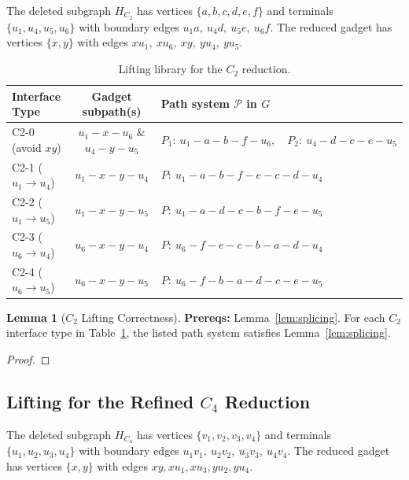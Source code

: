 \documentclass[12pt]{article}
\theoremstyle{definition}
\newtheorem{lemma}[theorem]{Lemma}
\begin{document}
The deleted subgraph $H_{C_2}$ has vertices $\{a,b,c,d,e,f\}$ and terminals
$\{u_1,u_4,u_5,u_6\}$ with boundary edges
$u_1a,\ u_4d,\ u_5e,\ u_6f$.
The reduced gadget has vertices $\{x,y\}$ with edges
$xu_1,\ xu_6,\ xy,\ yu_4,\ yu_5$.

\begin{table}[ht]
\centering
\begin{center}
\small
\begin{tabularx}{\textwidth}{|l|c|X|}
\hline
\textbf{Interface Type} &
\textbf{Gadget subpath(s)} &
\textbf{Path system $\mathcal{P}$ in $G$} \\
\hline
C2-0 (avoid $xy$) &
$u_1\!-\!x\!-\!u_6$ \& $u_4\!-\!y\!-\!u_5$ &
$P_1:\ u_1\!-\!a\!-\!b\!-\!f\!-\!u_6,\quad P_2:\ u_4\!-\!d\!-\!c\!-\!e\!-\!u_5$\\
\hline
C2-1 ($u_1 \to u_4$) &
$u_1\!-\!x\!-\!y\!-\!u_4$ &
$P:\ u_1\!-\!a\!-\!b\!-\!f\!-\!e\!-\!c\!-\!d\!-\!u_4$\\
\hline
C2-2 ($u_1 \to u_5$) &
$u_1\!-\!x\!-\!y\!-\!u_5$ &
$P:\ u_1\!-\!a\!-\!d\!-\!c\!-\!b\!-\!f\!-\!e\!-\!u_5$\\
\hline
C2-3 ($u_6 \to u_4$) &
$u_6\!-\!x\!-\!y\!-\!u_4$ &
$P:\ u_6\!-\!f\!-\!e\!-\!c\!-\!b\!-\!a\!-\!d\!-\!u_4$\\
\hline
C2-4 ($u_6 \to u_5$) &
$u_6\!-\!x\!-\!y\!-\!u_5$ &
$P:\ u_6\!-\!f\!-\!b\!-\!a\!-\!d\!-\!c\!-\!e\!-\!u_5$\\
\hline
\end{tabularx}
\end{center}
\caption{Lifting library for the $C_2$ reduction.}
\label{tab:lifting-c2}
\end{table}

\begin{lemma}[$C_2$ Lifting Correctness]
\label{lem:lifting-c2}
\textbf{Prereqs:} Lemma~\ref{lem:splicing}.
For each $C_2$ interface type in Table~\ref{tab:lifting-c2}, the listed path system
satisfies Lemma~\ref{lem:splicing}.
\end{lemma}

\begin{proof}
\end{proof}

\subsection{Lifting for the Refined \texorpdfstring{$C_4$}{C4} Reduction}
\label{subsec:lifting-c4}

The deleted subgraph $H_{C_4}$ has vertices $\{v_1,v_2,v_3,v_4\}$ and terminals
$\{u_1,u_2,u_3,u_4\}$ with boundary edges
$u_1v_1,\ u_2v_2,\ u_3v_3,\ u_4v_4$.
The reduced gadget has vertices $\{x,y\}$ with edges $xy, xu_1, xu_3, yu_2, yu_4$.
\end{document}
